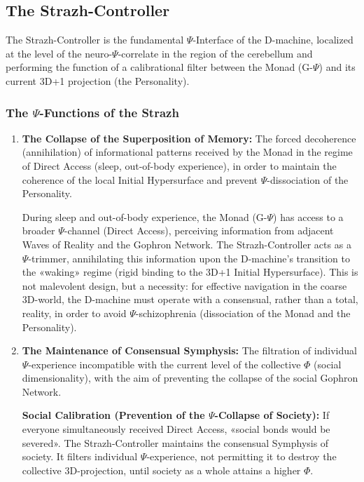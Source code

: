\documentclass[a4paper,12pt]{article}
\begin{document}
	\subsection{The Strazh-Controller}
	
	The Strazh-Controller is the fundamental $\Psi$-Interface of the D-machine, localized at the level of the neuro-$\Psi$-correlate in the region of the cerebellum and performing the function of a calibrational filter between the Monad (G-$\Psi$) and its current 3D+1 projection (the Personality).
	
	\subsubsection{The $\Psi$-Functions of the Strazh}
	
	\begin{enumerate}
		\item \textbf{The Collapse of the Superposition of Memory:} The forced decoherence (annihilation) of informational patterns received by the Monad in the regime of Direct Access (sleep, out-of-body experience), in order to maintain the coherence of the local Initial Hypersurface and prevent $\Psi$-dissociation of the Personality.
		
		During sleep and out-of-body experience, the Monad (G-$\Psi$) has access to a broader $\Psi$-channel (Direct Access), perceiving information from adjacent Waves of Reality and the Gophron Network. The Strazh-Controller acts as a $\Psi$-trimmer, annihilating this information upon the D-machine's transition to the «waking» regime (rigid binding to the 3D+1 Initial Hypersurface). This is not malevolent design, but a necessity: for effective navigation in the coarse 3D-world, the D-machine must operate with a consensual, rather than a total, reality, in order to avoid $\Psi$-schizophrenia (dissociation of the Monad and the Personality).
		
		\item \textbf{The Maintenance of Consensual Symphysis:} The filtration of individual $\Psi$-experience incompatible with the current level of the collective $\Phi$ (social dimensionality), with the aim of preventing the collapse of the social Gophron Network.
		
		\textbf{Social Calibration (Prevention of the $\Psi$-Collapse of Society):} If everyone simultaneously received Direct Access, «social bonds would be severed». The Strazh-Controller maintains the consensual Symphysis of society. It filters individual $\Psi$-experience, not permitting it to destroy the collective 3D-projection, until society as a whole attains a higher $\Phi$.
		

\end{enumerate}
\end{document}
